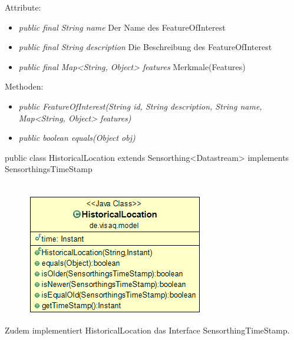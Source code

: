 Attribute:
\begin{itemize} 
	\item \emph{public final String name} Der Name des FeatureOfInterest
	\item \emph{public final String description} Die Beschreibung des FeatureOfInterest
	\item \emph{public final Map<String, Object> features} Merkmale(Features)
\end{itemize}
Methoden:
\begin{itemize} 
	\item \emph{public FeatureOfInterest(String id, String description, String name, Map<String, Object> features)} 
	\item \emph{public boolean equals(Object obj)} 
\end{itemize}


public class HistoricalLocation extends Sensorthing<Datastream> implements SensorthingsTimeStamp
\\\\
\begin{minipage}{0.3\textwidth}
	\begin{figure}[H]
		\includegraphics[scale = 0.5
		]{media/frontend/model/HistoricalLocationClass.png}
	\end{figure}
\end{minipage} \hfill
\begin{minipage}{0.6\textwidth}
	 Zudem implementiert HistoricalLocation das Interface SensorthingTimeStamp.
\end{minipage}

